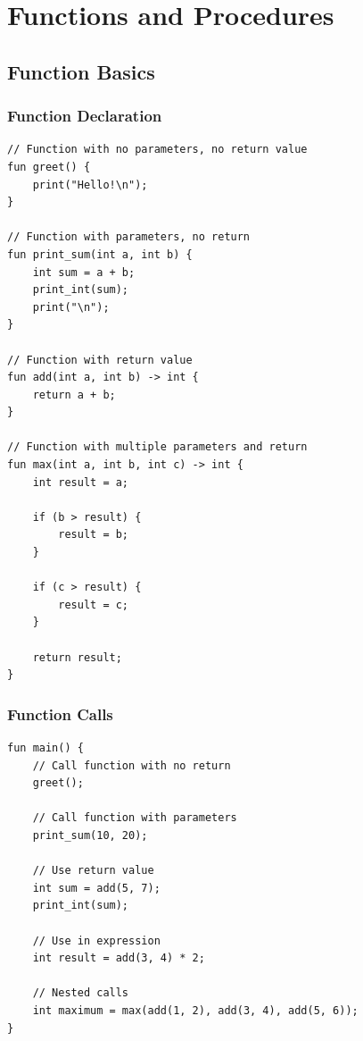 \documentclass[12pt,a4paper,oneside]{book}
\begin{document}
\chapter{Functions and Procedures}

\section{Function Basics}

\subsection{Function Declaration}

\begin{lstlisting}[style=algo, caption={Function Syntax}]
// Function with no parameters, no return value
fun greet() {
    print("Hello!\n");
}

// Function with parameters, no return
fun print_sum(int a, int b) {
    int sum = a + b;
    print_int(sum);
    print("\n");
}

// Function with return value
fun add(int a, int b) -> int {
    return a + b;
}

// Function with multiple parameters and return
fun max(int a, int b, int c) -> int {
    int result = a;
    
    if (b > result) {
        result = b;
    }
    
    if (c > result) {
        result = c;
    }
    
    return result;
}
\end{lstlisting}

\subsection{Function Calls}

\begin{lstlisting}[style=algo, caption={Calling Functions}]
fun main() {
    // Call function with no return
    greet();
    
    // Call function with parameters
    print_sum(10, 20);
    
    // Use return value
    int sum = add(5, 7);
    print_int(sum);
    
    // Use in expression
    int result = add(3, 4) * 2;
    
    // Nested calls
    int maximum = max(add(1, 2), add(3, 4), add(5, 6));
}
\end{lstlisting}
\end{document}
